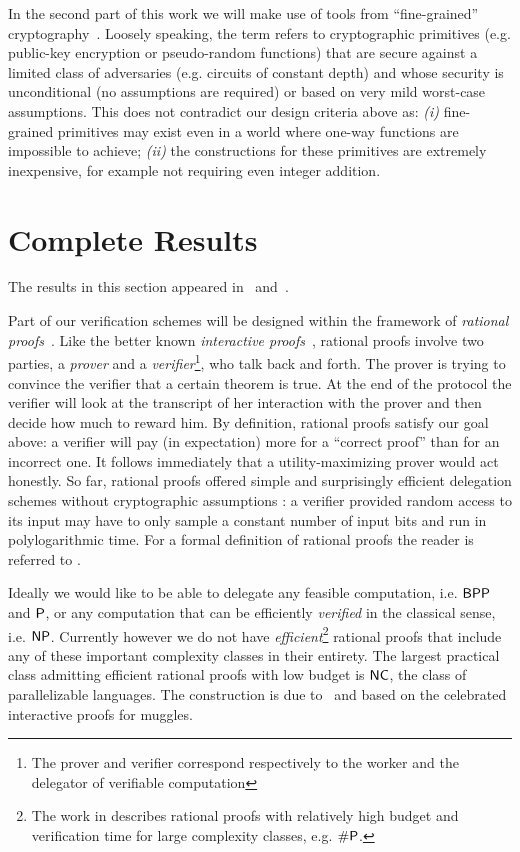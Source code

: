 {In the second part of this work we will make use of tools from ``fine-grained'' cryptography~\cite{fgcrypto}. Loosely speaking, the term refers to cryptographic primitives (e.g. public-key encryption or pseudo-random functions) that are secure against a limited class of adversaries (e.g. circuits of constant depth) and whose security is unconditional (no assumptions are required) or based on very mild worst-case assumptions. This does not contradict our design criteria above as: \textit{(i)} fine-grained primitives may exist even in a world  where one-way functions are impossible to achieve; \textit{(ii)} the constructions for these primitives are extremely inexpensive, for example not requiring even integer addition.

\section{Complete Results}

The results in this section appeared in~\cite{cg15} and~\cite{cg17}.

Part of our verification schemes will be designed within the framework of \textit{rational proofs}~\cite{am}. Like the better known \textit{interactive proofs}~\cite{gmr}, rational proofs involve two parties, a \textit{prover} and a \textit{verifier}\footnote{The prover and verifier correspond respectively to the worker and the delegator of verifiable computation}, who talk back and forth. The prover is trying to convince the verifier that a certain theorem is true. At the end of the protocol the verifier will look at the transcript of her interaction with the prover and then decide how much to reward him.
By definition, rational proofs satisfy our goal above: a verifier will pay (in expectation) more for a ``correct proof'' than for an incorrect one. It follows immediately that a utility-maximizing prover would act honestly.
So far, rational proofs offered simple and surprisingly efficient delegation schemes without cryptographic assumptions \cite{am1,ratargs,ratsumchecks}: a verifier provided random access to its input may have to only sample a constant number of input bits and run in polylogarithmic time. For  a formal definition of rational proofs the reader is referred to \cite{cg15}.

Ideally we would like to be able to delegate any feasible computation, i.e. $\BPP$ and $\P$, or any computation that can be efficiently  \textit{verified} in the classical sense, i.e. $\NP$. Currently however we do not have \textit{efficient}\footnote{The work in \cite{am} describes rational proofs with relatively high budget and verification time for large complexity classes, e.g. $\#\P$.} rational proofs that include any of these important complexity classes in their entirety. The largest practical class admitting efficient rational proofs with low budget is $\NC$, the class of parallelizable languages. The construction is due to~\cite{ratsumchecks} and based on the celebrated interactive proofs for muggles\cite{muggles}.

}
